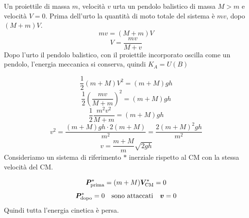 \begin{Es}
Un proiettile di massa $m$, velocità $v$ urta un pendolo balistico di massa $M>m$ e velocità $V=0$. Prima dell'urto la quantità di moto totale del sistema è $mv$, dopo $(M+m)V$.
\begin{equation*}mv=(M+m)V\end{equation*}
\begin{equation*}V=\frac{mv}{M+v}\end{equation*}
Dopo l'urto il pendolo balistico, con il proiettile incorporato oscilla come un pendolo, l'energia meccanica si conserva, quindi $K_A=U(B)$


\begin{equation*}\frac{1}{2}(m+M)V^2=(m+M)gh\end{equation*}
\begin{equation*}\frac{1}{2}\left(\frac{mv}{M+m}\right)^2=(m+M)gh\end{equation*}
\begin{equation*}\frac{1}{2}\frac{m^2v^2}{M+m}=(m+M)gh\end{equation*}
\begin{equation*}v^2=\frac{(m+M)gh\cdot 2(m+M)}{m^2}=\frac{2(m+M)^2gh}{m^2}\end{equation*}
\begin{equation*}v=\frac{m+M}{m}\sqrt{2gh}\end{equation*}
Consideriamo un sistema di riferimento $\ast$ inerziale rispetto
al CM con la stessa velocità del CM.

\begin{equation*}\boldsymbol{P}^\ast_{\text{prima}}=(m+M)\boldsymbol{V}_{\text{CM}}^\ast=0\end{equation*}
$$\boldsymbol{P}^\ast_{\text{dopo}}=0\quad\text{sono attaccati}\quad \boldsymbol{v}=0$$ Quindi tutta l'energia cinetica è persa.
\end{Es}
